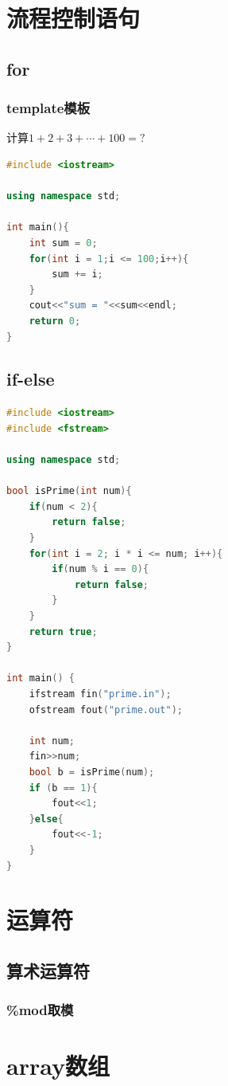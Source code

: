 \documentclass[12pt,twiside,a4paper]{ctexbook}
\numberwithin{chapter}{part}
\begin{document}
\chapter{流程控制语句}
\section{for}
\subsection{template模板}
计算$1+2+3+\cdots+100 = ?$
\begin{lstlisting}[language=C++]
#include <iostream>

using namespace std;

int main(){
	int sum = 0;
	for(int i = 1;i <= 100;i++){
		sum += i;
	}
	cout<<"sum = "<<sum<<endl;
	return 0;
}
\end{lstlisting}

\section{if-else}
\begin{lstlisting}[language=C++]
#include <iostream>
#include <fstream>

using namespace std;

bool isPrime(int num){
	if(num < 2){
		return false;
	}
	for(int i = 2; i * i <= num; i++){
		if(num % i == 0){
			return false;
		}
	}
	return true;
}

int main() {
	ifstream fin("prime.in");
	ofstream fout("prime.out");

	int num;
	fin>>num;
	bool b = isPrime(num);
	if (b == 1){
		fout<<1;
	}else{
		fout<<-1;
	}
}
\end{lstlisting}

\chapter{运算符}
\section{算术运算符}
\subsection{\%mod取模}


\chapter{array数组}
\end{document}
